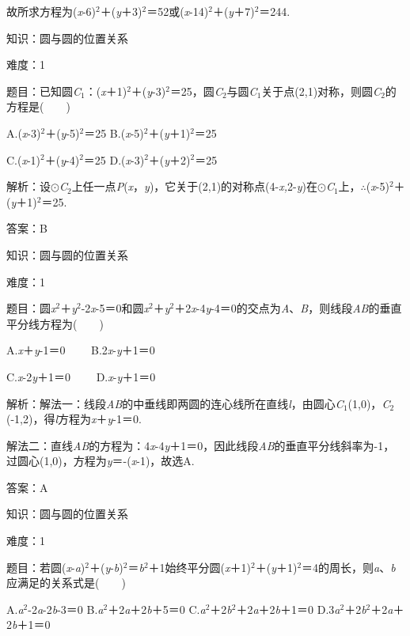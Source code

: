 \documentclass{article} %
\begin{document}
故所求方程为(\textit{x}-6)${}^{2}$＋(\textit{y}＋3)${}^{2}$＝52或(\textit{x}-14)${}^{2}$＋(\textit{y}＋7)${}^{2}$＝244.

知识：圆与圆的位置关系

难度：1

题目：已知圆\textit{C}${}_{1}$：(\textit{x}＋1)${}^{2}$＋(\textit{y}-3)${}^{2}$＝25，圆\textit{C}${}_{2}$与圆\textit{C}${}_{1}$关于点(2,1)对称，则圆\textit{C}${}_{2}$的方程是(　　)

A.(\textit{x}-3)${}^{2}$＋(\textit{y}-5)${}^{2}$＝25 B.(\textit{x}-5)${}^{2}$＋(\textit{y}＋1)${}^{2}$＝25

C.(\textit{x}-1)${}^{2}$＋(\textit{y}-4)${}^{2}$＝25 D.(\textit{x}-3)${}^{2}$＋(\textit{y}＋2)${}^{2}$＝25

解析：设$\mathrm{\odot}$\textit{C}${}_{2}$上任一点\textit{P}(\textit{x}，\textit{y})，它关于(2,1)的对称点(4-\textit{x,}2-\textit{y})在$\mathrm{\odot}$\textit{C}${}_{1}$上，$\mathrm{\therefore}$(\textit{x}-5)${}^{2}$＋(\textit{y}＋1)${}^{2}$＝25.

答案：B

知识：圆与圆的位置关系

难度：1

题目：圆\textit{x}${}^{2}$＋\textit{y}${}^{2}$-2\textit{x}-5＝0和圆\textit{x}${}^{2}$＋\textit{y}${}^{2}$＋2\textit{x}-4\textit{y}-4＝0的交点为\textit{A}、\textit{B}，则线段\textit{AB}的垂直平分线方程为(　　)

A.\textit{x}＋\textit{y}-1＝0　　  B.2\textit{x}-\textit{y}＋1＝0

C.\textit{x}-2\textit{y}＋1＝0　　  D.\textit{x}-\textit{y}＋1＝0

解析：解法一：线段\textit{AB}的中垂线即两圆的连心线所在直线\textit{l}，由圆心\textit{C}${}_{1}$(1,0)，\textit{C}${}_{2}$(-1,2)，得\textit{l}方程为\textit{x}＋\textit{y}-1＝0.

解法二：直线\textit{AB}的方程为：4\textit{x}-4\textit{y}＋1＝0，因此线段\textit{AB}的垂直平分线斜率为-1，过圆心(1,0)，方程为\textit{y}＝-(\textit{x}-1)，故选A.

答案：A

知识：圆与圆的位置关系

难度：1

题目：若圆(\textit{x}-\textit{a})${}^{2}$＋(\textit{y}-\textit{b})${}^{2}$＝\textit{b}${}^{2}$＋1始终平分圆(\textit{x}＋1)${}^{2}$＋(\textit{y}＋1)${}^{2}$＝4的周长，则\textit{a}、\textit{b}应满足的关系式是(　　)

A.\textit{a}${}^{2}$-2\textit{a}-2\textit{b}-3＝0  B.\textit{a}${}^{2}$＋2\textit{a}＋2\textit{b}＋5＝0
C.\textit{a}${}^{2}$＋2\textit{b}${}^{2}$＋2\textit{a}＋2\textit{b}＋1＝0 D.3\textit{a}${}^{2}$＋2\textit{b}${}^{2}$＋2\textit{a}＋2\textit{b}＋1＝0
\end{document}
